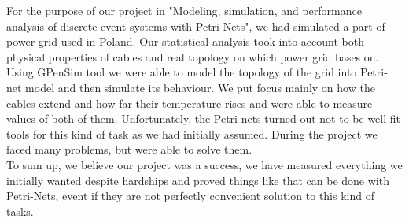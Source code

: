 \documentclass[a4paper]{article}
\begin{document}
For the purpose of our project in "Modeling, simulation, and performance analysis of discrete event systems with Petri-Nets", we had simulated a part of power grid used in Poland. Our statistical analysis took into account both physical properties of cables and real topology on which power grid bases on. Using GPenSim tool \cite{Art2} we were able to model the topology of the grid into Petri-net model and then simulate its behaviour. We put focus mainly on how the cables extend and how far their temperature rises and were able to measure values of both of them. Unfortunately, the Petri-nets turned out not to be well-fit tools for this kind of task as we had initially assumed. During the project we faced many problems, but were able to solve them.\\To sum up, we believe our project was a success, we have measured everything we initially wanted despite hardships and proved things like that can be done with Petri-Nets, event if they are not perfectly convenient solution to this kind of tasks.




%
\end{document}
